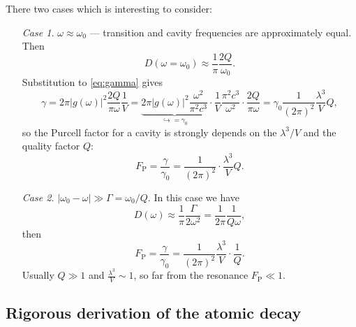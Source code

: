 There two cases which is interesting to consider:
\begin{enumerate}
	\item[\textit{Case 1.}] $\omega \approx \omega_0$ --- transition and cavity frequencies are approximately equal. Then
	\begin{equation}
		D(\omega = \omega_0) \approx \frac{1}{\pi} \frac{2Q}{\omega_0}.
	\end{equation}
	Substitution to \eqref{eq:gamma} gives
	\begin{equation}
		\gamma = 2\pi \left| g(\omega) \right|^2 \frac{2Q}{\pi \omega} \frac{1}{V} = \underbrace{2\pi \left| g(\omega) \right|^2 \frac{\omega^2}{\pi^2 c^3}}_{\hookrightarrow=\gamma_0} \cdot \frac{1}{V} \frac{\pi^2 c^3}{\omega^2} \cdot \frac{2Q}{\pi \omega} = \gamma_0 \frac{1}{\left(2\pi\right)^2} \frac{\lambda^3}{V} Q,
	\end{equation}
	so the Purcell factor for a cavity is strongly depends on the $\lambda^3/V$ and the quality factor $Q$:
	\begin{equation}
		\boxed{F_{\text{P}} = \frac{\gamma}{\gamma_0} = \frac{1}{\left(2\pi\right)^2} \cdot \frac{\lambda^3}{V} Q.}
	\end{equation}
	
	\item[\textit{Case 2.}] $\left|\omega_0 - \omega\right| \gg \Gamma = \omega_0 / Q$. In this case we have
	\begin{equation}
		D(\omega) \approx \frac{1}{\pi} \frac{\Gamma}{2 \omega^2} = \frac{1}{2\pi} \frac{1}{Q \omega},
	\end{equation}
	then
	\begin{equation}
		F_{\text{P}} = \frac{\gamma}{\gamma_0} = \frac{1}{\left(2\pi\right)^2} \frac{\lambda^3}{V} \cdot \frac{1}{Q}.
	\end{equation}
	Usually $Q \gg 1$ and $\frac{\lambda^3}{V} \sim 1$, so far from the resonance $F_{\text{P}} \ll 1$.
\end{enumerate}

\subsection{Rigorous derivation of the atomic decay}

